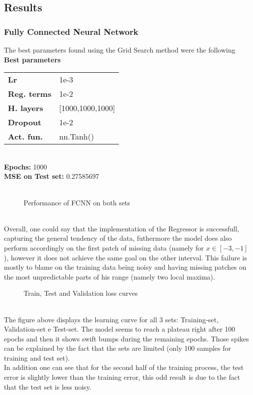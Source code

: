 \documentclass[11pt,a4paper,twocolumn]{IEEEtran}
\newcommand{\thinsepline}{\noindent\makebox[\linewidth]{\rule{7.5cm}{0.02pt}}}
\newcommand{\thinnersepline}{\noindent\makebox[\linewidth]{\rule{7.5cm}{0.01pt}}}
\begin{document}
			\subsection{\textbf{Results}}
				\subsubsection{Fully Connected Neural Network}
				The best parameters found using the Grid Search method were the following
				\thinsepline\\
				\textbf{Best parameters}\medskip\\
				\begin{tabular}{ll}
					\textbf{Lr}	& 1e-3 \\
					\textbf{Reg. terms}	& 1e-2 \\
					\textbf{H. layers} & [1000,1000,1000] \\
					\textbf{Dropout} & 1e-2 \\
					\textbf{Act. fun.} & nn.Tanh() \\
				\end{tabular}
				\thinnersepline\\
				\textbf{Epochs:} 1000\\
				\textbf{MSE on Test set:} 0.27585697\vspace*{-.2cm}\\
				\thinsepline\vspace*{-.7cm}\\
				\begin{figure}[h]
					\centering
					
					\caption{Performance of FCNN on both sets}
				\end{figure}\\
				Overall, one could say that the implementation of the Regressor is successfull, capturing the general tendency of the data, futhermore the model does also perform accordingly on the first patch of missing data (namely for $x\in[-3,-1]$), however it does not achieve the same goal on the other interval. This failure is mostly to blame on the training data being noisy and having missing patches on the most unpredictable parts of his range (namely two local maxima).
				\begin{figure}[h]
					\centering
					
					\caption{Train, Test and Validation loss curves}
				\end{figure}\\
				The figure above displays the learning curve for all 3 sets: Training-set, Validation-set e Test-set. The model seems to reach a plateau right after 100 epochs and then it shows swift bumps during the remaining epochs. Those spikes can be explained by the fact that the sets are limited (only 100 samples for training and test set).\\ In addition one can see that for the second half of the training process, the test error is slightly lower than the training error, this odd result is due to the fact that the test set is less noisy.\\ 
\end{document}
